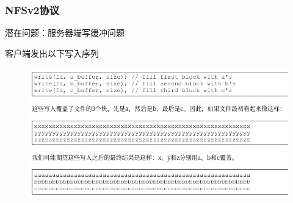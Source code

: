 \begin{frame}[fragile]
    \frametitle{NFSv2协议}
    潜在问题：服务器端写缓冲问题\pause
    
    客户端发出以下写入序列
    
        \begin{figure}
            \includegraphics[width=.8\linewidth]{figs/nfsv2-srv1.png}
        \end{figure}
    
\end{frame}

